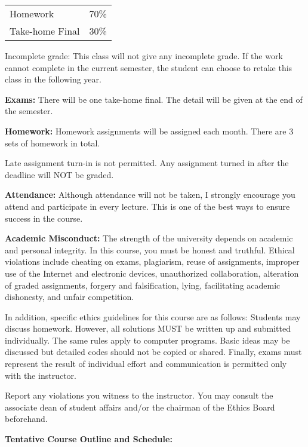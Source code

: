 \documentclass[a4paper,10pt]{article}
\begin{document}
\begin{tabular}{lr}
Homework & 70\%\\ 
Take-home Final & 30\% \\
\end{tabular}

Incomplete grade: This class will not give any
incomplete grade. If the work cannot complete in the
current semester, the student can choose to retake this
class in the following year.




\textbf{Exams:} There will be one take-home final. The detail will be given at the end of the semester. 


\textbf{Homework:} Homework assignments will be assigned each month. There are 3 sets of homework in total. 

Late assignment turn-in is not permitted. Any assignment turned in after the deadline will NOT be graded.




\textbf{Attendance:} Although attendance will not be taken, I strongly encourage you attend and participate in every lecture. This is one of the best ways to ensure success in the course.






\textbf{Academic Misconduct:} The strength of the university depends on academic and personal integrity. In this course, you must be honest 
and truthful. Ethical violations include cheating on exams, plagiarism, reuse of assignments, improper use 
of the Internet and electronic devices, unauthorized collaboration, alteration of graded assignments, forgery 
and falsification, lying, facilitating academic dishonesty, and unfair competition.

In addition, specific ethics guidelines for this course are as follows: Students may discuss homework. However, 
all solutions MUST be written up and submitted individually. The same rules apply to computer programs. 
Basic ideas may be discussed but detailed codes should not be copied or shared. Finally, exams must 
represent the result of individual effort and communication is permitted only with the instructor.

Report any violations you witness to the instructor. You may consult the associate dean of student affairs 
and/or the chairman of the Ethics Board beforehand. 

\textbf{Tentative Course Outline and Schedule:}
\end{document}
